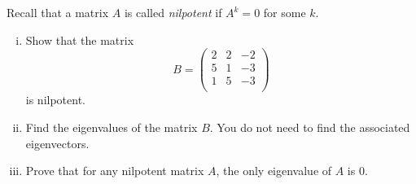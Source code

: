 \begin{question}\normalfont

Recall that a matrix $A$ is called \emph{nilpotent} if $A^k=0$ for some $k$. 

\begin{enumerate}[(i)]
\item Show that the matrix 
\[
B =\begin{pmatrix}
			2 & 2 & -2\\
			5 & 1 & -3\\
			1 & 5 & -3 \\
		\end{pmatrix}
\]
is nilpotent.

\item Find the eigenvalues of the matrix $B$. You do not need to find the associated eigenvectors. 

\item Prove that for any nilpotent matrix $A$, the only eigenvalue of $A$ is 0. 
\end{enumerate}
	
	\end{question}
